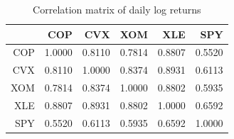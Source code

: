 \begin{table}[ht]
\centering
\caption{Correlation matrix of daily log returns} 
\label{tab:correlation}
\begin{tabular}{rrrrrr}
  \toprule
 & COP & CVX & XOM & XLE & SPY \\ 
  \midrule
COP & 1.0000 & 0.8110 & 0.7814 & 0.8807 & 0.5520 \\ 
  CVX & 0.8110 & 1.0000 & 0.8374 & 0.8931 & 0.6113 \\ 
  XOM & 0.7814 & 0.8374 & 1.0000 & 0.8802 & 0.5935 \\ 
  XLE & 0.8807 & 0.8931 & 0.8802 & 1.0000 & 0.6592 \\ 
  SPY & 0.5520 & 0.6113 & 0.5935 & 0.6592 & 1.0000 \\ 
   \bottomrule
\end{tabular}
\end{table}
